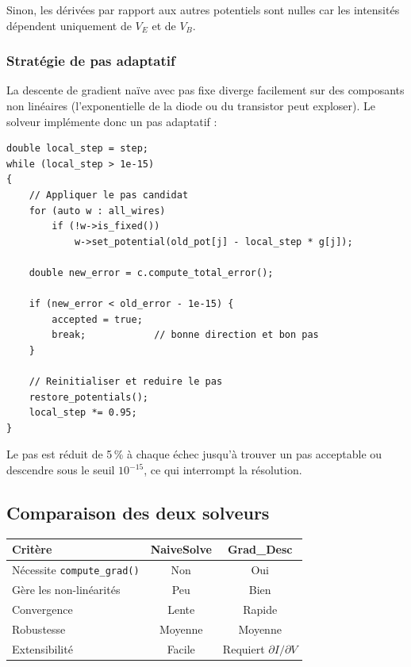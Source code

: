 \documentclass[12pt,a4paper]{article}
\begin{document}
Sinon, les dérivées par rapport aux autres potentiels sont nulles car les intensités dépendent uniquement de $V_E$ et de $V_B$.

\subsubsection{Stratégie de pas adaptatif}

La descente de gradient naïve avec pas fixe diverge facilement sur des composants
non linéaires (l'exponentielle de la diode ou du transistor peut exploser). Le solveur implémente
donc un pas adaptatif :

\begin{lstlisting}[caption={implémentation du pas adaptatif (crtSolver.hpp)}]
double local_step = step;
while (local_step > 1e-15)
{
    // Appliquer le pas candidat
    for (auto w : all_wires)
        if (!w->is_fixed())
            w->set_potential(old_pot[j] - local_step * g[j]);

    double new_error = c.compute_total_error();

    if (new_error < old_error - 1e-15) {
        accepted = true;
        break;            // bonne direction et bon pas
    }

    // Reinitialiser et reduire le pas
    restore_potentials();
    local_step *= 0.95;
}
\end{lstlisting}

Le pas est réduit de 5\,\% à chaque échec jusqu'à trouver un pas acceptable ou
descendre sous le seuil $10^{-15}$, ce qui interrompt la résolution.


\subsection{Comparaison des deux solveurs}

\begin{center}
\begin{tabular}{lcc}
  \toprule
  \textbf{Critère} & \textbf{NaiveSolve} & \textbf{Grad\_Desc} \\
  \midrule
  Nécessite \texttt{compute\_grad()} & Non & Oui \\
  Gère les non-linéarités & Peu & Bien \\
  Convergence & Lente & Rapide \\
  Robustesse & Moyenne & Moyenne \\
  Extensibilité & Facile & Requiert $\partial I / \partial V$ \\
  \bottomrule
\end{tabular}
\end{center}
\end{document}
